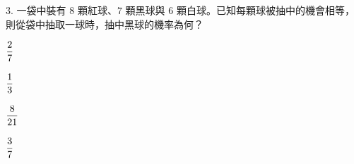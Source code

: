 \documentclass[12pt]{article}
\begin{document}
\begin{problem}
  \item[3.] 一袋中裝有 $8$ 顆紅球、$7$ 顆黑球與 $6$ 顆白球。已知每顆球被抽中的機會相等，則從袋中抽取一球時，抽中黑球的機率為何？
  \begin{choices}
    \item $\fraction{2}{7}$
    \item $\fraction{1}{3}$
    \item $\fraction{8}{21}$
    \item $\fraction{3}{7}$
  \end{choices}
\end{problem}
\end{document}
